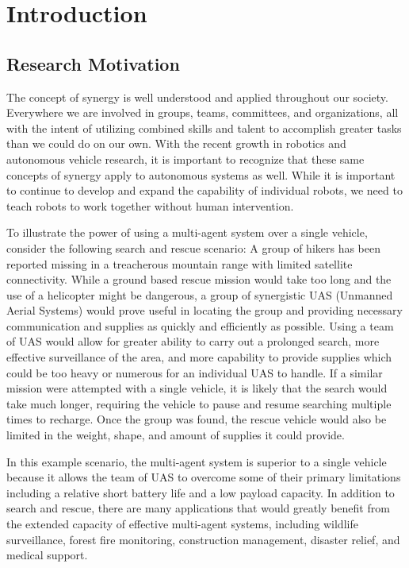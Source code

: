 \chapter{Introduction}
\label{ch:introduction}

\section{Research Motivation}
\label{sec:intro_motivation}
The concept of synergy is well understood and applied throughout our society. Everywhere we are involved in groups, teams, committees, and organizations, all with the intent of utilizing combined skills and talent to accomplish greater tasks than we could do on our own. With the recent growth in robotics and autonomous vehicle research, it is important to recognize that these same concepts of synergy apply to autonomous systems as well. While it is important to continue to develop and expand the capability of individual robots, we need to teach robots to work together without human intervention.

To illustrate the power of using a multi-agent system over a single vehicle, consider the following search and rescue scenario: A group of hikers has been reported missing in a treacherous mountain range with limited satellite connectivity. While a ground based rescue mission would take too long and the use of a helicopter might be dangerous, a group of synergistic UAS (Unmanned Aerial Systems) would prove useful in locating the group and providing necessary communication and supplies as quickly and efficiently as possible. Using a team of UAS would allow for greater ability to carry out a prolonged search, more effective surveillance of the area, and more capability to provide supplies which could be too heavy or numerous for an individual UAS to handle. If a similar mission were attempted with a single vehicle, it is likely that the search would take much longer, requiring the vehicle to pause and resume searching multiple times to recharge. Once the group was found, the rescue vehicle would also be limited in the weight, shape, and amount of supplies it could provide.

In this example scenario, the multi-agent system is superior to a single vehicle because it allows the team of UAS to overcome some of their primary limitations including a relative short battery life and a low payload capacity. In addition to search and rescue, there are many applications that would greatly benefit from the extended capacity of effective multi-agent systems, including wildlife surveillance, forest fire monitoring, construction management, disaster relief, and medical support.

